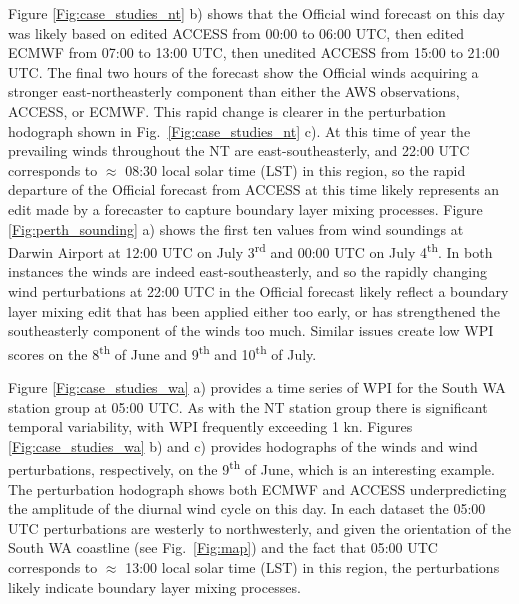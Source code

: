 \documentclass{ametsoc}
\begin{document}
Figure \ref{Fig:case_studies_nt} b) shows that the Official wind forecast on this day was likely based on edited ACCESS from 00:00 to 06:00 UTC, then edited ECMWF from 07:00 to 13:00 UTC, then unedited ACCESS from 15:00 to 21:00 UTC. The final two hours of the forecast show the Official winds acquiring a stronger east-northeasterly component than either the AWS observations, ACCESS, or ECMWF. This rapid change is clearer in the perturbation hodograph shown in Fig.~\ref{Fig:case_studies_nt} c). At this time of year the prevailing winds throughout the NT are east-southeasterly, and 22:00 UTC corresponds to $\approx$ 08:30 local solar time (LST) in this region, so the rapid departure of the Official forecast from ACCESS at this time likely represents an edit made by a forecaster to capture boundary layer mixing processes. Figure \ref{Fig:perth_sounding} a) shows the first ten values from wind soundings at Darwin Airport at 12:00 UTC on July 3\textsuperscript{rd} and 00:00 UTC on July 4\textsuperscript{th}. In both instances the winds are indeed east-southeasterly, and so the rapidly changing wind perturbations at 22:00 UTC in the Official forecast likely reflect a boundary layer mixing edit that has been applied either too early, or has strengthened the southeasterly component of the winds too much. Similar issues create low WPI scores on the 8\textsuperscript{th} of June and 9\textsuperscript{th} and 10\textsuperscript{th} of July.

Figure \ref{Fig:case_studies_wa} a) provides a time series of WPI for the South WA station group at 05:00 UTC. As with the NT station group there is significant temporal variability, with WPI frequently exceeding 1 kn. Figures \ref{Fig:case_studies_wa} b) and c) provides hodographs of the winds and wind perturbations, respectively, on the 9\textsuperscript{th} of June, which is an interesting example. The perturbation hodograph shows both ECMWF and ACCESS underpredicting the amplitude of the diurnal wind cycle on this day. In each dataset the 05:00 UTC perturbations are westerly to northwesterly, and given the orientation of the South WA coastline (see Fig.~\ref{Fig:map}) and the fact that 05:00 UTC corresponds to $\approx$ 13:00 local solar time (LST) in this region, the perturbations likely indicate boundary layer mixing processes. 
\end{document}
